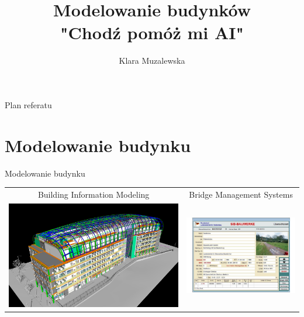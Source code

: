 \documentclass[10pt]{beamer}
\author{Klara Muzalewska}
\title{Modelowanie budynków\vspace{0.7cm}
 \\ "Chodź pomóż mi AI"}
\begin{document}
\begin{frame}

\titlepage
\end{frame}


\begin{frame}{Plan referatu}
 \tableofcontents[sections={1-4}]
\end{frame}

\section{Modelowanie budynku}

\begin{frame}{Modelowanie budynku}
\begin{tabular}{c c}

Building Information Modeling & Bridge Management Systems\\
\includegraphics[scale=0.07]{bim.jpeg}

&


\includegraphics[scale=0.27]{BMS.png}


\end{tabular} 

\end{frame}
\end{document}
